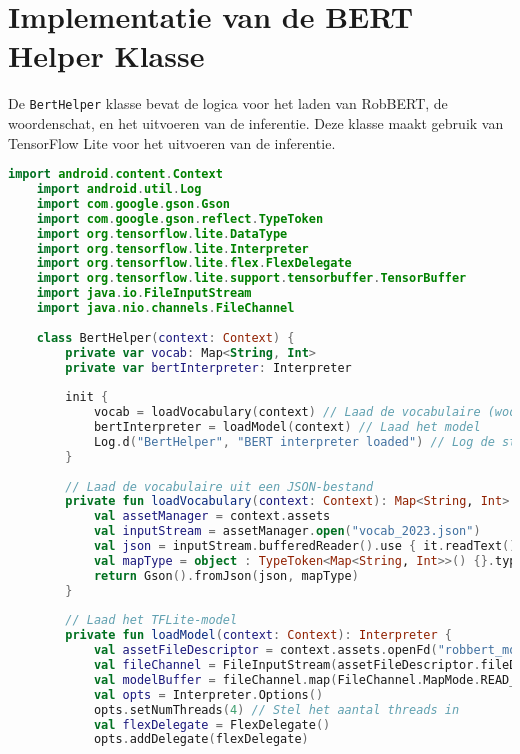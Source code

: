 \section{Implementatie van de BERT Helper Klasse}

De \texttt{BertHelper} klasse bevat de logica voor het laden van RobBERT, de woordenschat, en het uitvoeren van de inferentie. Deze klasse maakt gebruik van TensorFlow Lite voor het uitvoeren van de inferentie.

\begin{lstlisting}[language=Kotlin, caption={Implementatie van BertHelper}]
    import android.content.Context
    import android.util.Log
    import com.google.gson.Gson
    import com.google.gson.reflect.TypeToken
    import org.tensorflow.lite.DataType
    import org.tensorflow.lite.Interpreter
    import org.tensorflow.lite.flex.FlexDelegate
    import org.tensorflow.lite.support.tensorbuffer.TensorBuffer
    import java.io.FileInputStream
    import java.nio.channels.FileChannel
    
    class BertHelper(context: Context) {
        private var vocab: Map<String, Int>
        private var bertInterpreter: Interpreter
        
        init {
            vocab = loadVocabulary(context) // Laad de vocabulaire (woordenlijst)
            bertInterpreter = loadModel(context) // Laad het model
            Log.d("BertHelper", "BERT interpreter loaded") // Log de status
        }
        
        // Laad de vocabulaire uit een JSON-bestand
        private fun loadVocabulary(context: Context): Map<String, Int> {
            val assetManager = context.assets
            val inputStream = assetManager.open("vocab_2023.json")
            val json = inputStream.bufferedReader().use { it.readText() }
            val mapType = object : TypeToken<Map<String, Int>>() {}.type
            return Gson().fromJson(json, mapType)
        }
        
        // Laad het TFLite-model
        private fun loadModel(context: Context): Interpreter {
            val assetFileDescriptor = context.assets.openFd("robbert_model.tflite")
            val fileChannel = FileInputStream(assetFileDescriptor.fileDescriptor).channel
            val modelBuffer = fileChannel.map(FileChannel.MapMode.READ_ONLY, assetFileDescriptor.startOffset, assetFileDescriptor.declaredLength)
            val opts = Interpreter.Options()
            opts.setNumThreads(4) // Stel het aantal threads in
            val flexDelegate = FlexDelegate()
            opts.addDelegate(flexDelegate)
            

\end{lstlisting}
